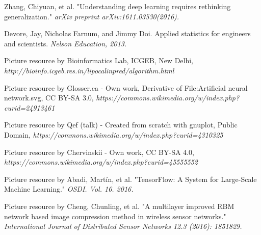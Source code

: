\documentclass[12pt]{report} %
\begin{document}
\begin{thebibliography}{}
	Zhang, Chiyuan, et al. "Understanding deep learning requires rethinking generalization." \textit{arXiv preprint arXiv:1611.03530(2016).}

	Devore, Jay, Nicholas Farnum, and Jimmy Doi. Applied statistics for engineers and scientists. \textit{Nelson Education, 2013.}

	Picture resource by Bioinformatics Lab, ICGEB, New Delhi,
	\textit{http://bioinfo.icgeb.res.in/lipocalinpred/algorithm.html}

	Picture resource by Glosser.ca - Own work, Derivative of File:Artificial neural network.svg, CC BY-SA 3.0, \textit{https://commons.wikimedia.org/w/index.php?curid=24913461}

	Picture resource by Qef (talk) - Created from scratch with gnuplot, Public Domain, \textit{https://commons.wikimedia.org/w/index.php?curid=4310325}

	Picture resource by Chervinskii - Own work, CC BY-SA 4.0,  \textit{https://commons.wikimedia.org/w/index.php?curid=45555552}

	Picture resource by Abadi, Martín, et al. "TensorFlow: A System for Large-Scale Machine Learning." \textit{OSDI. Vol. 16. 2016.}

	Picture resource by Cheng, Chunling, et al. "A multilayer improved RBM network based image compression method in wireless sensor networks." \textit{International Journal of Distributed Sensor Networks 12.3 (2016): 1851829.}


\end{thebibliography}
\end{document}
